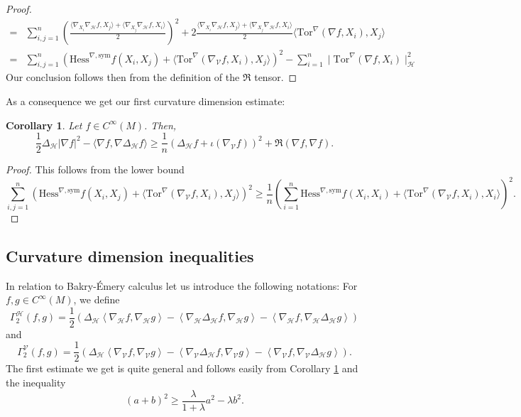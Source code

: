 \documentclass[11pt]{article}
\numberwithin{equation}{section}
\newtheorem{corollary}[theorem]{Corollary}
\newcommand{\Ho}{\mathcal H}
\newcommand{\V}{\mathcal V}
\newcommand{\Tor}{\mathrm{Tor}}
\begin{document}
\begin{proof}
\begin{align*}
=&\sum_{i,j=1}^n \left(\frac{\langle \nabla_{X_i} \nabla_\Ho f,X_j\rangle +\langle \nabla_{X_j} \nabla_\Ho f,X_i\rangle}{2} \right)^2+ 2 \frac{\langle \nabla_{X_i} \nabla_\Ho f,X_j\rangle +\langle \nabla_{X_j} \nabla_\Ho f,X_i\rangle}{2} \langle \mathrm{Tor}^\nabla(\nabla f, X_i),X_j \rangle \\
=&\sum_{i,j=1}^n \left( \mathrm{Hess}^{\nabla, \mathrm{sym}} f(X_i , X_j)+\langle \Tor^\nabla(\nabla_\V f,X_i),X_j \rangle \right)^2-\sum_{i=1}^n\mid \mathrm{Tor}^\nabla(\nabla f, X_i)\mid_\Ho^2
\end{align*}
	Our conclusion follows then from the definition of the $\mathfrak{R}$ tensor.
	\end{proof}

    As a consequence we get our first curvature dimension estimate:

    \begin{corollary}\label{Bochner's inequality}
Let $f \in C^\infty (M)$. Then,
\[
\frac{1}{2}\Delta_{\mathcal{H}} | \nabla f|^2-\langle \nabla f , \nabla \Delta_{\mathcal{H}} f \rangle \ge \frac{1}{n} (\Delta_\Ho f +\iota (\nabla_\V f))^2+\mathfrak{R} (\nabla f,\nabla f).
\]
    \end{corollary}

    \begin{proof}
This follows from the lower bound
\[
\sum_{i,j=1}^n \left( \mathrm{Hess}^{\nabla, \mathrm{sym}} f (X_i , X_j)+\langle \Tor^\nabla(\nabla_\V f,X_i),X_j \rangle \right)^2 \ge \frac{1}{n} \left( \sum_{i=1}^n  \mathrm{Hess}^{\nabla, \mathrm{sym}}f (X_i , X_i)+\langle \Tor^\nabla(\nabla_\V f,X_i),X_i \rangle \right)^2.
\]
    \end{proof}

    \subsection{Curvature dimension inequalities}

    In relation to Bakry-\'Emery calculus let us introduce the following notations: For $f,g \in C^\infty (M)$, we define
    \[
    \Gamma^\Ho_2 (f,g)=\frac{1}{2}\left( \Delta_\Ho \left\langle \nabla_\Ho f, \nabla_\Ho g \right\rangle -\left\langle \nabla_\Ho \Delta_\Ho f, \nabla_\Ho g \right\rangle - \left\langle \nabla_\Ho  f, \nabla_\Ho \Delta_\Ho g \right\rangle \right)
    \]
  and  
	\[
    \Gamma^\V_2 (f,g)=\frac{1}{2}\left( \Delta_\Ho \left\langle \nabla_\V f, \nabla_\V g \right\rangle -\left\langle \nabla_\V \Delta_\Ho f, \nabla_\V g \right\rangle - \left\langle \nabla_\V  f, \nabla_\V \Delta_\Ho g \right\rangle \right).
    \]
The first estimate we get is quite general and follows easily from Corollary \ref{Bochner's inequality} and the  inequality
\[
(a+b)^2 \ge \frac{\lambda}{1+\lambda}a^2 -\lambda b^2.
\]
\end{document}
